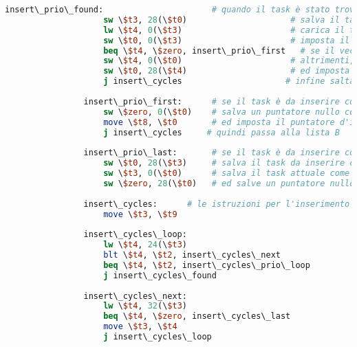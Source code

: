 \begin{center}
\begin{lstlisting}[language=mips, gobble=14, stepnumber=1]
                insert\_prio\_found:                      # quando il task è stato trovato
                    sw \$t3, 28(\$t0)                     # salva il task attuale come prossimo del task da inserire
                    lw \$t4, 0(\$t3)                      # carica il task precedente al task attuale
                    sw \$t0, 0(\$t3)                      # imposta il task da inserire come nuovo precedente del task attuale
                    beq \$t4, \$zero, insert\_prio\_first   # se il vecchio precedente è nullo, allora il task è da inserire come primo della lista
                    sw \$t4, 0(\$t0)                      # altrimenti, imposta il task precedente al task attuale come precedente del task da inserire
                    sw \$t0, 28(\$t4)                     # ed imposta il task da inserire come successivo del precedente del task attuale
                    j insert\_cycles                     # infine salta alle istruzioni per l'inserimento nella lista B
                    
                insert\_prio\_first:      # se il task è da inserire come primo della lista
                    sw \$zero, 0(\$t0)    # salva un puntatore nullo come precedente del task da inserire
                    move \$t8, \$t0       # ed imposta il puntatore d'inizio della lista A al task da inserire
                    j insert\_cycles     # quindi passa alla lista B
                    
                insert\_prio\_last:       # se il task è da inserire come ultimo della lista
                    sw \$t0, 28(\$t3)     # salva il task da inserire come successivo del task attuale
                    sw \$t3, 0(\$t0)      # salva il task attuale come precedente del task da inserire
                    sw \$zero, 28(\$t0)   # ed salve un puntatore nullo come successivo del task da inserire
                    
                insert\_cycles:      # le istruzioni per l'inserimento nella lista B sono speculari a quelle per la lista A
                    move \$t3, \$t9
                    
                insert\_cycles\_loop:
                    lw \$t4, 24(\$t3)
                    blt \$t4, \$t2, insert\_cycles\_next
                    beq \$t4, \$t2, insert\_cycles\_prio\_loop
                    j insert\_cycles\_found
                    
                insert\_cycles\_next:
                    lw \$t4, 32(\$t3)
                    beq \$t4, \$zero, insert\_cycles\_last
                    move \$t3, \$t4
                    j insert\_cycles\_loop
                    

\end{lstlisting}
\end{center}

